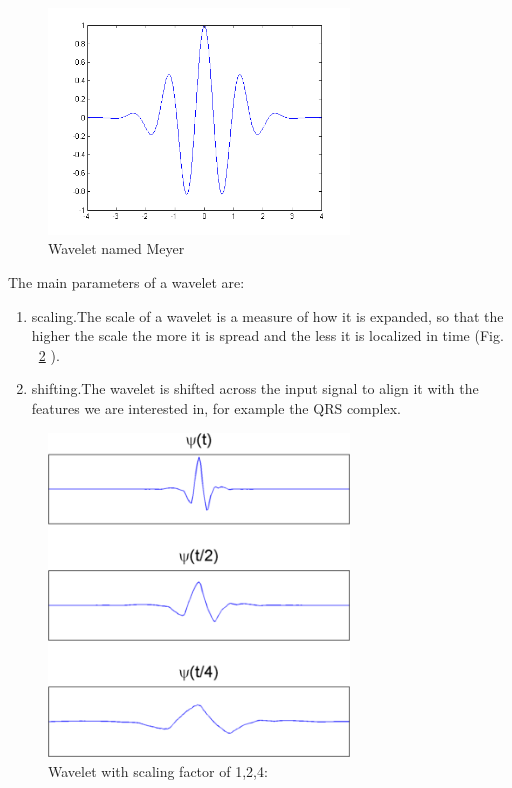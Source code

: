 \documentclass[LaM,binding=0.6cm]{sapthesis}
\begin{document}
\begin{figure}[H]  \centering
    \includegraphics[width=80mm,scale=0.7]{waveletexample.png}
    \caption{Wavelet named Meyer}
    \label{fig:we}
\end{figure}
The main parameters of a wavelet are:
\begin{enumerate}
\item scaling.The scale of a wavelet is a measure of how it is expanded, so that the higher the scale the more it is spread and the less it is localized in time (Fig. ~\ref{fig:ws} ).
\item shifting.The wavelet is shifted across the input signal to align it with the features we are interested in, for example the QRS complex.
\end{enumerate}
\begin{figure}[H]  \centering
    \includegraphics[width=80mm,scale=0.7]{wavescale.png}
    \caption{Wavelet with scaling factor of 1,2,4: \cite{matdwt} }
    \label{fig:ws}
\end{figure}
\end{document}
